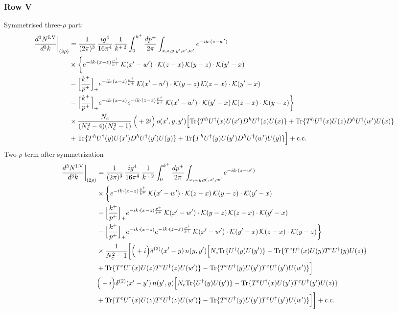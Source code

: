\documentclass[9pt]{article}
\numberwithin{equation}{section}
\begin{document}
\subsubsection*{Row V}
Symmetrised three-$\rho$ part:
\begin{align}
\frac{d^{3}N^{\rm I.V}}{d^{3}k}\bigg|_{(3\rho)}&=\frac{1}{(2\pi)^{3}}\,\frac{ig^{4}}{16\pi^{4}}\,\frac{1}{k^{+\,2}}\int_{0}^{k^{+}}\frac{dp^{+}}{2\pi}\int_{x,z,y,y',x',w'}e^{-ik\cdot(z-w')}\notag\\
&\times\bigg\{e^{-ik\cdot(x-z)\frac{p^{+}}{k^{+}}}\,\mathcal{K}(x'-w')\cdot\mathcal{K}(z-x)\,\mathcal{K}(y-z)\cdot\mathcal{K}(y'-x)\notag\\
&-\Big[\frac{k^{+}}{p^{+}}\Big]_{+}e^{-ik\cdot(x-z)\frac{p^{+}}{k^{+}}}\,\mathcal{K}(x'-w')\cdot\mathcal{K}(y-z)\,\mathcal{K}(z-x)\cdot\mathcal{K}(y'-x)\notag\\
&-\Big[\frac{k^{+}}{p^{+}}\Big]_{+}e^{-ik\cdot(x-z)}e^{-ik\cdot(z-x)\frac{p^{+}}{k^{+}}}\,\mathcal{K}(x'-w')\cdot\mathcal{K}(y'-x)\,\mathcal{K}(z-x)\cdot\mathcal{K}(y-z)\bigg\}\notag\\
&\times \frac{N_{c}}{(N_{c}^{2}-4)(N_{c}^{2}-1)}\,\Big(+2i\Big)\,o(x',y,y')\Big[{\rm Tr}\{T^{h}U^{\dagger}(x)U(x')D^{h}U^{\dagger}(z)U(x)\}+{\rm Tr}\{T^{h}U^{\dagger}(x)U(z)D^{h}U^{\dagger}(w')U(x)\}\notag\\
& +{\rm Tr}\{T^{h}U^{\dagger}(y)U(x')D^{h}U^{\dagger}(y')U(y)\}+{\rm Tr}\{T^{h}U^{\dagger}(y)U(y')D^{h}U^{\dagger}(w')U(y)\}\Big]+{\rm c.c.}\label{eq:E-I.V-3}
\end{align}
Two $\rho$ term after symmetrization
\begin{align}
\frac{d^{3}N^{\rm I.V}}{d^{3}k}\bigg|_{(2\rho)} &=\frac{1}{(2\pi)^{3}}\,\frac{ig^{4}}{16\pi^{4}}\,\frac{1}{k^{+\,2}}\int_{0}^{k^{+}}\frac{dp^{+}}{2\pi}\int_{x,z,y,y',x',w'}e^{-ik\cdot(z-w')}\notag\\
&\times\bigg\{e^{-ik\cdot(x-z)\frac{p^{+}}{k^{+}}}\,\mathcal{K}(x'-w')\cdot\mathcal{K}(z-x)\,\mathcal{K}(y-z)\cdot\mathcal{K}(y'-x)\notag\\
&-\Big[\frac{k^{+}}{p^{+}}\Big]_{+}e^{-ik\cdot(x-z)\frac{p^{+}}{k^{+}}}\,\mathcal{K}(x'-w')\cdot\mathcal{K}(y-z)\,\mathcal{K}(z-x)\cdot\mathcal{K}(y'-x)\notag\\
&-\Big[\frac{k^{+}}{p^{+}}\Big]_{+}e^{-ik\cdot(x-z)}e^{-ik\cdot(z-x)\frac{p^{+}}{k^{+}}}\,\mathcal{K}(x'-w')\cdot\mathcal{K}(y'-x)\,\mathcal{K}(z-x)\cdot\mathcal{K}(y-z)\bigg\}\notag\\
&\times \frac{1}{N_{c}^{2}-1}\bigg[\Big(+i\Big)\delta^{(2)}(x'-y)\,n(y,y')\Big[N_{c}{\rm Tr}\{U^{\dagger}(y)U(y')\}-{\rm Tr}\{T^{e}U^{\dagger}(x)U(y)T^{e}U^{\dagger}(y)U(z)\}\notag\\
& +{\rm Tr}\{T^{e}U^{\dagger}(x)U(z)T^{e}U^{\dagger}(z)U(w')\}-{\rm Tr}\{T^{e}U^{\dagger}(y)U(y')T^{e}U^{\dagger}(y')U(w')\}\Big]\notag\\
& \Big(-i\Big)\delta^{(2)}(x'-y')\,n(y',y)\Big[N_{c}{\rm Tr}\{U^{\dagger}(y)U(y')\}-{\rm Tr}\{T^{e}U^{\dagger}(x)U(y')T^{e}U^{\dagger}(y')U(z)\}\notag\\
& +{\rm Tr}\{T^{e}U^{\dagger}(x)U(z)T^{e}U^{\dagger}(z)U(w')\}-{\rm Tr}\{T^{e}U^{\dagger}(y)U(y')T^{e}U^{\dagger}(y')U(w')\}\Big]\bigg]+{\rm c.c.}\label{eq:E-I.V-2}
\end{align}
\end{document}
